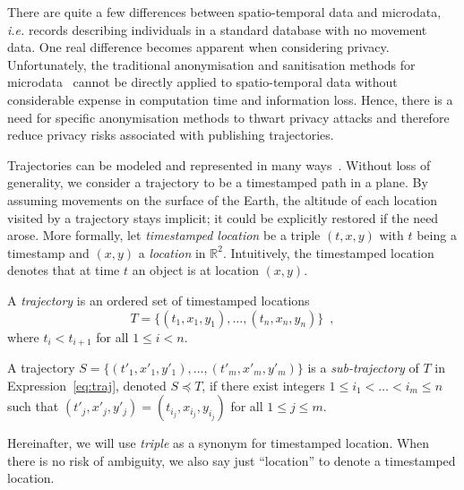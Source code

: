 There are quite a few differences between spatio-temporal data and
microdata, {\em i.e.} records describing individuals in a standard
database with no movement data.
One real difference becomes apparent when considering
privacy. Unfortunately, the traditional anonymisation and sanitisation
methods for microdata~\cite{fung10} cannot be directly applied to
spatio-temporal data without considerable expense in computation time and
information loss. Hence, there is a need for specific anonymisation methods
to thwart privacy attacks and therefore reduce privacy risks associated with
publishing trajectories.

Trajectories can be modeled and represented in many ways~\cite{forlizzi00}.
Without loss of generality, we
consider a trajectory to be a timestamped path in a plane. By assuming
movements on the surface of the Earth, the altitude of each location
visited by a trajectory stays implicit; it could be explicitly restored
if the need arose. More formally,
let \emph{timestamped location} be a triple $(t,x,y)$ with $t$ being a
timestamp and
$(x,y)$ a \emph{location} in $\mathbb{R}^2$. Intuitively, the
timestamped location denotes
that at time $t$ an object is at location $(x,y)$.

\begin{definition}[Trajectory] \label{def:traj}
A \emph{trajectory} is an ordered set of timestamped locations
\begin{equation} \label{eq:traj}
T = \{ (t_1,x_1,y_1), \ldots, (t_n,x_n,y_n) \} \enspace,
\end{equation}
where $t_i < t_{i+1}$ for all $1 \leq i < n$.
\end{definition}

\begin{definition}\label{def:subtraj}
A trajectory $S = \{ (t'_1,x'_1,y'_1), \ldots, (t'_m,x'_m,y'_m) \}$ is a
\emph{sub-trajectory} of $T$ in Expression~\ref{eq:traj}, denoted
$S \preceq T$, if there exist
integers $1 \leq i_1 < \ldots < i_m \leq n$ such that $(t'_j,x'_j,y'_j) =
(t_{i_j},x_{i_j},y_{i_j})$ for all $1 \le j \le m$.
\end{definition}

Hereinafter, we will use {\em triple} as a synonym for
timestamped location.
When there is no risk of ambiguity,
we also say just ``location'' to denote a timestamped location.


